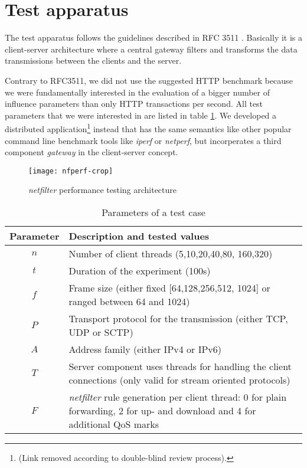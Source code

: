 \documentclass{sig-alternate}
\begin{document}
\section{Test apparatus}
\label{sec::apparatus}
\noindent The test apparatus follows the guidelines described in RFC 3511 
\cite{/RFC3511/}. Basically it is a client-server architecture where a 
central gateway filters and transforms the data transmissions between the 
clients and the server.

Contrary to RFC3511, we did not use the suggested HTTP benchmark because we 
were fundamentally interested in the evaluation of a bigger number of influence 
parameters than only HTTP transactions per se\-cond. All test parameters that 
we were interested in are listed in table \ref{tab::parameters}. We developed a 
distributed application\footnote{(Link removed according to double-blind 
review process).} instead that has the same semantics like other popular command 
line benchmark tools like \emph{iperf} or \emph{netperf}, but incorperates a 
third component \emph{gateway} in the client-server concept.
\begin{figure}[!t]
\texttt{[image: nfperf-crop]}
\caption{\emph{netfilter} performance testing architecture}
\label{fig::architecture}
\end{figure}
\begin{table}[htb]
\caption{Parameters of a test case}\label{tab::parameters}
\footnotesize
\begin{tabular}{|c|p{}|}
\hline \textbf{Parameter} & \textbf{Description and tested values} \\
\hline $n$ & Number of client threads (5,10,20,40,80, 160,320) \\
\hline $t$ & Duration of the experiment (100s) \\
\hline $f$ & Frame size (either fixed [64,128,256,512, 1024] or ranged between 
64 and 1024) \\
\hline $P$ & Transport protocol for the transmission (either TCP, UDP or SCTP) 
\\
\hline $A$ & Address family (either IPv4 or IPv6) \\
\hline $T$ & Server component uses threads for handling the client connections 
(only valid for stream oriented protocols) \\
\hline $F$ & \emph{netfilter} rule generation per client thread: 0 for plain 
forwarding, 2 for up- and download and 4 for additional QoS marks \\
\hline
\end{tabular}
\end{table}
\end{document}

